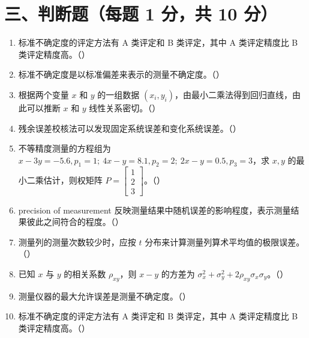 \documentclass[UTF8,12pt,a4paper]{ctexart}
\begin{document}
\newpage

\section*{三、判断题（每题 1 分，共 10 分）}
\begin{enumerate}[label=\arabic*、]
\item 标准不确定度的评定方法有 A 类评定和 B 类评定，其中 A 类评定精度比 B 类评定精度高。（\quad）
\item 标准不确定度是以标准偏差来表示的测量不确定度。（\quad）
\item 根据两个变量 $x$ 和 $y$ 的一组数据 $(x_i,y_i)$，由最小二乘法得到回归直线，由此可以推断 $x$ 和 $y$ 线性关系密切。（\quad）
\item 残余误差校核法可以发现固定系统误差和变化系统误差。（\quad）
\item 不等精度测量的方程组为 $x-3y=-5.6,p_1=1;\ 4x-y=8.1,p_2=2;\ 2x-y=0.5,p_3=3$，求 $x,y$ 的最小二乘估计，则权矩阵 $P=\begin{bmatrix}1\\2\\3\end{bmatrix}$。（\quad）
\item precision of measurement 反映测量结果中随机误差的影响程度，表示测量结果彼此之间符合的程度。（\quad）
\item 测量列的测量次数较少时，应按 $t$ 分布来计算测量列算术平均值的极限误差。（\quad）
\item 已知 $x$ 与 $y$ 的相关系数 $\rho_{xy}$，则 $x-y$ 的方差为 $\sigma_x^2+\sigma_y^2+2\rho_{xy}\sigma_x\sigma_y$。（\quad）
\item 测量仪器的最大允许误差是测量不确定度。（\quad）
\item 标准不确定度的评定方法有 A 类评定和 B 类评定，其中 A 类评定精度比 B 类评定精度高。（\quad）
\end{enumerate}

\newpage
\end{document}
